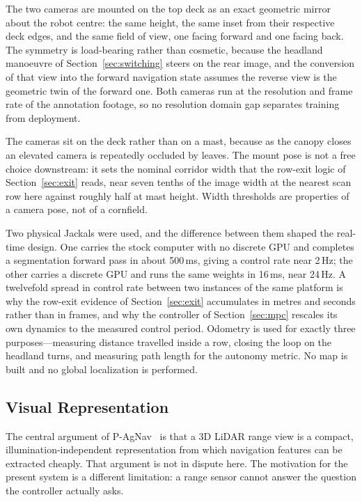 \documentclass[conference]{IEEEtran}
\begin{document}
The two cameras are mounted on the top deck as an exact geometric mirror about
the robot centre: the same height, the same inset from their respective deck
edges, and the same field of view, one facing forward and one facing back. The
symmetry is load-bearing rather than cosmetic, because the headland manoeuvre of
Section~\ref{sec:switching} steers on the rear image, and the conversion of that
view into the forward navigation state assumes the reverse view is the geometric
twin of the forward one. Both cameras run at the resolution and frame rate of
the annotation footage, so no resolution domain gap separates training from
deployment.

The cameras sit on the deck rather than on a mast, because as the canopy closes
an elevated camera is repeatedly occluded by leaves. The mount pose is not a
free choice downstream: it sets the nominal corridor width that the row-exit
logic of Section~\ref{sec:exit} reads, near seven tenths of the image width at
the nearest scan row here against roughly half at mast height. Width thresholds
are properties of a camera pose, not of a cornfield.

Two physical Jackals were used, and the difference between them shaped the
real-time design. One carries the stock computer with no discrete GPU and
completes a segmentation forward pass in about 500\,ms, giving a control rate
near 2\,Hz; the other carries a discrete GPU and runs the same weights in
16\,ms, near 24\,Hz. A twelvefold spread in control rate between two instances
of the same platform is why the row-exit evidence of Section~\ref{sec:exit}
accumulates in metres and seconds rather than in frames, and why the controller
of Section~\ref{sec:mpc} rescales its own dynamics to the measured control
period. Odometry is used for exactly three purposes---measuring distance
travelled inside a row, closing the loop on the headland turns, and measuring
path length for the autonomy metric. No map is built and no global localization
is performed.

\subsection{Visual Representation}
The central argument of P-AgNav~\cite{kim2025pagnav} is that a 3D LiDAR range
view is a compact, illumination-independent representation from which navigation
features can be extracted cheaply. That argument is not in dispute here. The
motivation for the present system is a different limitation: a range sensor
cannot answer the question the controller actually asks.
\end{document}

